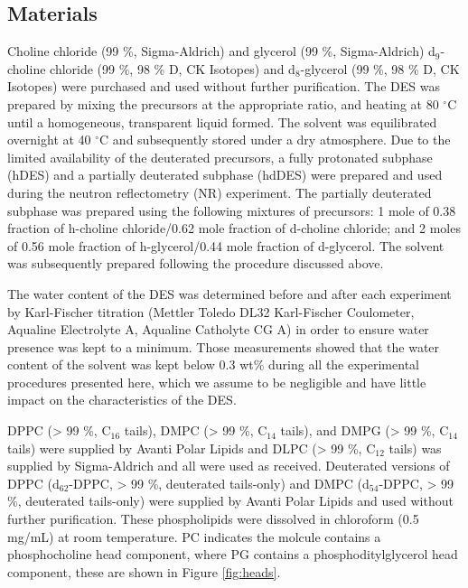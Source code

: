 \documentclass[twoside,twocolumn,9pt]{article}
\begin{document}
\subsection{Materials}
Choline chloride (99 \%, Sigma-Aldrich) and glycerol (99 \%, Sigma-Aldrich) d$_9$-choline chloride (99 \%, 98 \% D, CK Isotopes) and d$_8$-glycerol (99 \%, 98 \% D, CK Isotopes)  were purchased and used without further purification. The DES was prepared by mixing the precursors at the appropriate ratio, and heating at 80 $^\circ$C until a homogeneous, transparent liquid formed.\cite{Smith2014} The solvent was equilibrated overnight at 40 $^\circ$C and subsequently stored under a dry atmosphere. Due to the limited availability of the deuterated precursors, a fully protonated subphase (hDES) and a partially deuterated subphase (hdDES) were prepared and used during the neutron reflectometry (NR) experiment. The partially deuterated subphase was prepared using the following mixtures of precursors: 1 mole of 0.38 fraction of h-choline chloride/0.62 mole fraction of d-choline chloride; and 2 moles of 0.56 mole fraction of h-glycerol/0.44 mole fraction of d-glycerol. The solvent was subsequently prepared following the procedure discussed above.

The water content of the DES was determined before and after each experiment by Karl-Fischer titration (Mettler Toledo DL32 Karl-Fischer Coulometer, Aqualine Electrolyte A, Aqualine Catholyte CG A) in order to ensure water presence was kept to a minimum. Those measurements showed that the water content of the solvent was kept below 0.3 wt\% during all the experimental procedures presented here, which we assume to be negligible and have little impact on the characteristics of the DES.\cite{Hammond2016,Hammond2017}

DPPC (> 99 \%, C$_{16}$ tails), DMPC (> 99 \%, C$_{14}$ tails), and DMPG (> 99 \%, C$_{14}$ tails) were supplied by Avanti Polar Lipids and DLPC (> 99 \%, C$_{12}$ tails) was supplied by Sigma-Aldrich and all were used as received. Deuterated versions of DPPC (d$_{62}$-DPPC, > 99 \%, deuterated tails-only) and DMPC (d$_{54}$-DPPC, > 99 \%, deuterated tails-only) were supplied by Avanti Polar Lipids and used without further purification. These phospholipids were dissolved in chloroform (0.5 mg/mL) at room temperature. PC indicates the molcule contains a phosphocholine head component, where PG contains a phosphoditylglycerol head component, these are shown in Figure \ref{fig:heads}.
\end{document}
